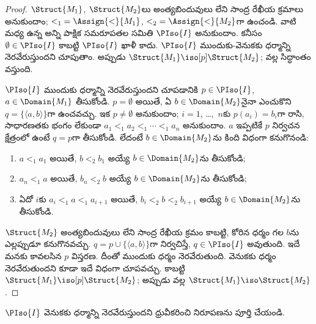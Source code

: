\documentclass[../../../include/open-logic-section]{subfiles}
\begin{document}
\begin{proof}
  $\Struct{M_1}$, $\Struct{M_2}$లు అంత్యబిందువులు లేని
   సాంద్ర రేఖీయ క్రమాలు అనుకుందాం;
  ${<_1}=\Assign{<}{M_1}$, ${<_2}=\Assign{<}{M_2}$గా ఉంచండి. వాటి మధ్య ఉన్న
  అన్ని పాక్షిక సమరూపతల సమితి $\PIso{I}$ అనుకుందాం. కనీసం
  $\emptyset\in\PIso{I}$ కాబట్టి $\PIso{I}$ ఖాళీ కాదు.
  $\PIso{I}$ ముందుకు-వెనుకకు ధర్మాన్ని నెరవేరుస్తుందని చూపుతాం. అప్పుడు
  $\Struct{M_1}\iso[p]\Struct{M_2}$;  వల్ల
  సిద్ధాంతం వస్తుంది.

  $\PIso{I}$ ముందుకు ధర్మాన్ని నెరవేరుస్తుందని చూపడానికి
  $p\in\PIso{I}$, $a\in\Domain{M_1}$ తీసుకోండి. $p=\emptyset$ అయితే,
  ఏ $b\in\Domain{M_2}$నైనా ఎంచుకొని
  $q=\{\langle a,b\rangle\}$గా ఉంచవచ్చు. ఇక $p\ne\emptyset$
  అనుకుందాం; $i=1$, \dots,~$n$కు $p(a_i)=b_i$గా రాసి, సాధారణతకు
  భంగం లేకుండా $a_1<_1a_2<_1\cdots<_1a_n$ అనుకుందాం.
  $a$ ఇప్పటికే $p$ నిర్వచన క్షేత్రంలో ఉంటే $q=p$గా తీసుకోండి.
  లేదంటే $b\in\Domain{M_2}$ను కింది విధంగా కనుగొనండి:
  \begin{enumerate}
  \item $a<_1a_1$ అయితే, $b<_2b_1$ అయ్యే
    $b\in\Domain{M_2}$ను తీసుకోండి;
  \item $a_n<_1a$ అయితే, $b_n<_2b$ అయ్యే
    $b\in\Domain{M_2}$ను తీసుకోండి;
  \item ఏదో $i$కు $a_i<_1a<_1a_{i+1}$ అయితే,
    $b_i<_2b<_2b_{i+1}$ అయ్యే $b\in\Domain{M_2}$ను తీసుకోండి.
  \end{enumerate}
  $\Struct{M_2}$ అంత్యబిందువులు లేని సాంద్ర రేఖీయ క్రమం కాబట్టి,
  కోరిన ధర్మం గల $b$ను ఎల్లప్పుడూ కనుగొనవచ్చు.
  $q=p\cup\{\langle a,b\rangle\}$గా నిర్వచిస్తే,
  $q\in\PIso{I}$ అవుతుంది. ఇదే మనకు కావలసిన $p$ విస్తరణ. దీంతో ముందుకు ధర్మం
  నెరవేరుతుంది. వెనుకకు ధర్మం నెరవేరుతుందని కూడా ఇదే విధంగా చూపవచ్చు.
  కాబట్టి $\Struct{M_1}\iso[p]\Struct{M_2}$; అప్పుడు
   వల్ల
  $\Struct{M_1}\iso\Struct{M_2}$.
\end{proof}

\begin{prob}
  $\PIso{I}$ వెనుకకు ధర్మాన్ని నెరవేరుస్తుందని ధ్రువీకరించి
   నిరూపణను పూర్తి చేయండి.
\end{prob}
\end{document}
